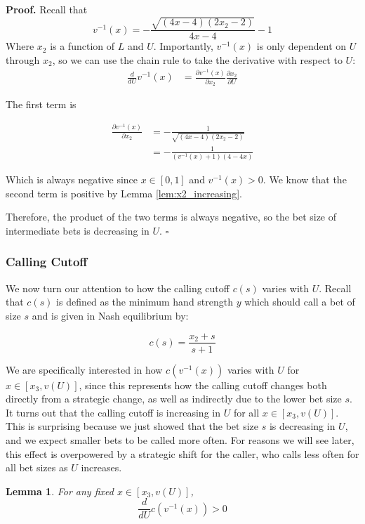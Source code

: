 \documentclass[a4paper,12pt]{article}
\theoremstyle{plain}
\newtheorem{lemma}{Lemma}[section]
\theoremstyle{definition}
\newenvironment{customproof}[1][Proof]{\noindent\textbf{#1.} }{\hfill$\square$\vspace{1em}}
\begin{document}
\begin{customproof}
    Recall that 
    $$v^{-1}(x) = -\frac{\sqrt{(4 x-4) (2 x_2-2)}}{4 x-4}-1$$
    Where $x_2$ is a function of $L$ and $U$. Importantly, $v^{-1}(x)$ is only dependent on $U$ through $x_2$, so we can use the chain rule to take the derivative with respect to $U$:
    \begin{align*}
        \frac{d}{dU} v^{-1}(x) & = \frac{\partial v^{-1}(x)}{\partial x_2} \frac{\partial x_2}{\partial U}
    \end{align*}

    The first term is 

\begin{align*}
    \frac{\partial v^{-1}(x)}{\partial x_2} & = - \frac{1}{\sqrt{(4 x-4) (2 x_2-2)}} \\
    &= - \frac{1}{(v^{-1}(x)+1)(4-4x)}
\end{align*}

    Which is always negative since $x \in [0, 1]$ and $v^{-1}(x) >0 $. We know that the second term is positive by Lemma \ref{lem:x2_increasing}.

    Therefore, the product of the two terms is always negative, so the bet size of intermediate bets is decreasing in $U$.
\end{customproof}

\subsubsection{Calling Cutoff}

We now turn our attention to how the calling cutoff $c(s)$ varies with $U$. Recall that $c(s)$ is defined as the minimum hand strength $y$ which should call a bet of size $s$ and is given in Nash equilibrium by:

$$c(s) = \frac{x_2 + s}{s+1}$$

We are specifically interested in how $c(v^{-1}(x))$ varies with $U$ for $x \in [x_3, v(U)]$, since this represents how the calling cutoff changes both directly from a strategic change, as well as indirectly due to the lower bet size $s$. It turns out that the calling cutoff is increasing in $U$ for all $x \in [x_3, v(U)]$. This is surprising because we just showed that the bet size $s$ is decreasing in $U$, and we expect smaller bets to be called more often. For reasons we will see later, this effect is overpowered by a strategic shift for the caller, who calls less often for all bet sizes as $U$ increases. 

\begin{lemma}
    \label{lem:c_increasing}
    For any fixed $x \in [x_3, v(U)]$, 
    \[ 
        \frac{d}{dU} c(v^{-1}(x)) > 0
    \]
\end{lemma}
\end{document}

